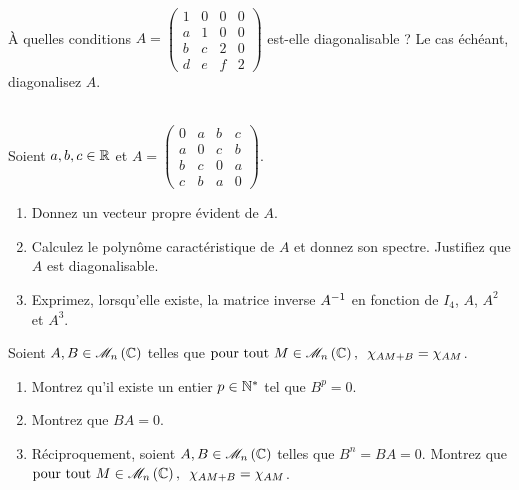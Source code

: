 \begin{corr}
\end{corr}

\begin{exo}~\\
À quelles conditions \(A=\begin{pmatrix}
1 & 0 & 0 & 0 \\
a & 1 & 0 & 0 \\
b & c & 2 & 0 \\
d & e & f & 2
\end{pmatrix}\) est-elle diagonalisable ? Le cas échéant, diagonalisez \(A\).
\end{exo}

\begin{corr}
\end{corr}

\begin{exo}~\\
Soient \(a,b,c\in\mathbb{R}\) et \(A=\begin{pmatrix}
0 & a & b & c \\
a & 0 & c & b \\
b & c & 0 & a \\
c & b & a & 0
\end{pmatrix}\).

\begin{enumerate}
    \item Donnez un vecteur propre évident de \(A\). \\
    \item Calculez le polynôme caractéristique de \(A\) et donnez son spectre. Justifiez que \(A\) est diagonalisable. \\
    \item Exprimez, lorsqu'elle existe, la matrice inverse \(A^{-1}\) en fonction de \(I_4\), \(A\), \(A^2\) et \(A^3\).
\end{enumerate}
\end{exo}

\begin{corr}
\end{corr}

\begin{exo}
Soient \(A,B\in\M{n}[\C]\) telles que \(\quantifs{\tpt M\in\M{n}[\C]}\chi_{AM+B}=\chi_{AM}\).

\begin{enumerate}
    \item Montrez qu'il existe un entier \(p\in\mathbb{N}^*\) tel que \(B^p=0\). \\
    \item Montrez que \(BA=0\). \\
    \item Réciproquement, soient \(A,B\in\M{n}[\C]\) telles que \(B^n=BA=0\). Montrez que \(\quantifs{\tpt M\in\M{n}[\C]}\chi_{AM+B}=\chi_{AM}\).
\end{enumerate}
\end{exo}


